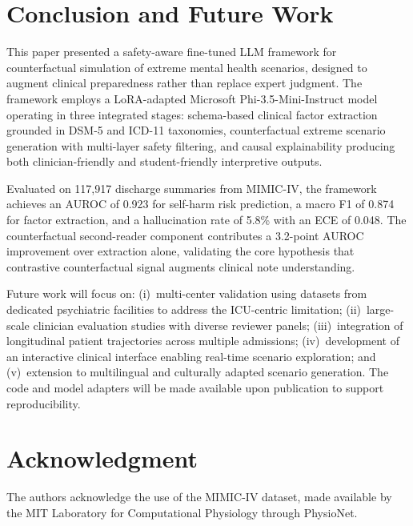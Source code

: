 \documentclass[conference]{IEEEtran}
\begin{document}
\section{Conclusion and Future Work}

This paper presented a safety-aware fine-tuned LLM framework for counterfactual simulation of extreme mental health scenarios, designed to augment clinical preparedness rather than replace expert judgment. The framework employs a LoRA-adapted Microsoft Phi-3.5-Mini-Instruct model operating in three integrated stages: schema-based clinical factor extraction grounded in DSM-5 and ICD-11 taxonomies, counterfactual extreme scenario generation with multi-layer safety filtering, and causal explainability producing both clinician-friendly and student-friendly interpretive outputs.

Evaluated on 117,917 discharge summaries from MIMIC-IV, the framework achieves an AUROC of 0.923 for self-harm risk prediction, a macro F1 of 0.874 for factor extraction, and a hallucination rate of 5.8\% with an ECE of 0.048. The counterfactual second-reader component contributes a 3.2-point AUROC improvement over extraction alone, validating the core hypothesis that contrastive counterfactual signal augments clinical note understanding.

Future work will focus on: (i)~multi-center validation using datasets from dedicated psychiatric facilities to address the ICU-centric limitation; (ii)~large-scale clinician evaluation studies with diverse reviewer panels; (iii)~integration of longitudinal patient trajectories across multiple admissions; (iv)~development of an interactive clinical interface enabling real-time scenario exploration; and (v)~extension to multilingual and culturally adapted scenario generation. The code and model adapters will be made available upon publication to support reproducibility.

\section*{Acknowledgment}

The authors acknowledge the use of the MIMIC-IV dataset, made available by the MIT Laboratory for Computational Physiology through PhysioNet.
\end{document}
